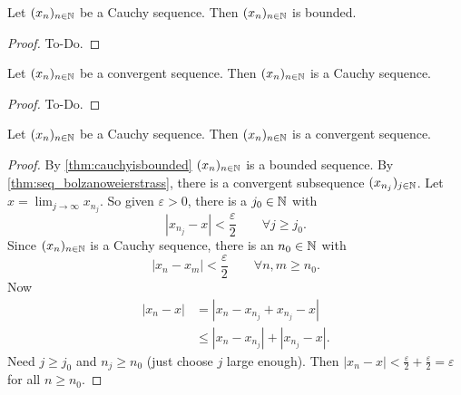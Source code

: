 \begin{theorem}\label{thm:cauchyisbounded}
    Let $(x_n)_{n \in \mathbb{N}}$ be a Cauchy sequence.
    Then $(x_n)_{n \in \mathbb{N}}$ is bounded.
\end{theorem}
\begin{proof}
    To-Do.
\end{proof}

\begin{theorem}\label{thm:cauchyconverges}
    Let $(x_n)_{n \in \mathbb{N}}$ be a convergent sequence.
    Then $(x_n)_{n \in \mathbb{N}}$ is a Cauchy sequence.
\end{theorem}
\begin{proof}
    To-Do.
\end{proof}

\begin{theorem}\label{thm:cauchyconvergent}
    Let $(x_n)_{n \in \mathbb{N}}$ be a Cauchy sequence.
    Then $(x_n)_{n \in \mathbb{N}}$ is a convergent sequence.
\end{theorem}
\begin{proof}
    By \autoref{thm:cauchyisbounded} $(x_n)_{n \in \mathbb{N}}$ is a bounded sequence.
    By \autoref{thm:seq_bolzanoweierstrass},
    there is a convergent subsequence $(x_{n_j})_{j \in \mathbb{N}}$.
    Let $x = \lim_{j \to \infty}x_{n_j}$.
    So given $\varepsilon > 0$,
    there is a $j_0 \in \mathbb{N}$ with
    \[
    |x_{n_j} - x| < \frac{\varepsilon}{2}\qquad\forall j \geq j_0.
    \]
    Since $(x_n)_{n \in \mathbb{N}}$ is a Cauchy sequence,
    there is an $n_0 \in \mathbb{N}$ with
    \[
    |x_n - x_m| < \frac{\varepsilon}{2}\qquad\forall n, m \geq n_0.
    \]
    Now
    \begin{align*}
        |x_n - x| &= |x_n - x_{n_j} + x_{n_j} - x| \\
        &\leq |x_n - x_{n_j}| + |x_{n_j} - x|.
    \end{align*}
    Need $j \geq j_0$ and $n_j \geq n_0$
    (just choose $j$ large enough).
    Then $|x_n - x| < \frac{\varepsilon}{2} + \frac{\varepsilon}{2} = \varepsilon$ for all $n \geq n_0$.
\end{proof}


